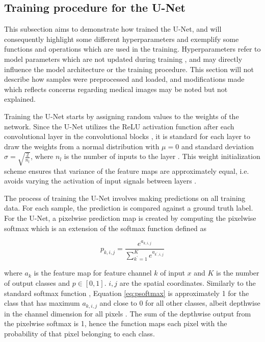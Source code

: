 \documentclass[../main/thesis.tex]{subfiles}
\begin{document}
\subsection{Training procedure for the U-Net}
\label{sec:training-loop}
This subsection aims to demonstrate how \citet{Ronneberger2015} trained the U-Net, and will consequently highlight some different hyperparameters and exemplify some functions and operations which are used in the training. Hyperparameters refer to model parameters which are not updated during training \citep{Yu2020a}, and may directly influence the model architecture or the training procedure. This section will not describe how samples were preprocessed and loaded, and modifications made which reflects concerns regarding medical images may be noted but not explained.

Training the U-Net starts by assigning random values to the weights of the network. Since the U-Net utilizes the ReLU activation function after each convolutional layer in the convolutional blocks \citep{Ronneberger2015}, it is standard for each layer to draw the weights from a normal distribution with $\mu = 0$ and standard deviation $\sigma = \sqrt{\frac{2}{n_l}}$, where $n_l$ is the number of inputs to the layer \citep{He2015}. This weight initialization scheme ensures that variance of the feature maps are approximately equal, i.e. avoids varying the activation of input signals between layers \citep{He2015,Ronneberger2015}.

The process of training the U-Net involves making predictions on all training data. For each sample, the prediction is compared against a ground truth label. For the U-Net, a pixelwise prediction map is created by computing the pixelwise softmax which is an extension of the softmax function \citep{Bridle1990} defined as 

\begin{equation}
    \label{eq:psoftmax}
    p_{k,i,j} = \frac{e^{a_{k,i,j}}}{\sum_{k^{\prime} = 1}^Ke^{a_{k^\prime,i,j}}}
\end{equation}

where $a_k$ is the feature map for feature channel $k$ of input $x$ and $K$ is the number of output classes and $p \in \left[0, 1\right]$. $i,j$ are the spatial coordinates. Similarly to the standard softmax function \citep{Bridle1990}, Equation \ref{eq:psoftmax} is approximately 1 for the class that has maximum $a_{k,i,j}$ and close to 0 for all other classes, albeit depthwise in the channel dimension for all pixels \citep{Ronneberger2015}. The sum of the depthwise output from the pixelwise softmax is 1, hence the function maps each pixel with the probability of that pixel belonging to each class. 
\end{document}
